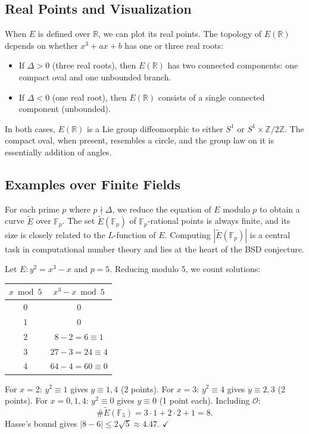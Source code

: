 \subsection{Real Points and Visualization}

When $E$ is defined over $\mathbb{R}$, we can plot its real points. The topology of $E(\mathbb{R})$ depends on whether $x^3 + ax + b$ has one or three real roots:
\begin{itemize}
\item If $\Delta > 0$ (three real roots), then $E(\mathbb{R})$ has two connected components: one compact oval and one unbounded branch.
\item If $\Delta < 0$ (one real root), then $E(\mathbb{R})$ consists of a single connected component (unbounded).
\end{itemize}

In both cases, $E(\mathbb{R})$ is a Lie group diffeomorphic to either $S^1$ or $S^1 \times \mathbb{Z}/2\mathbb{Z}$. The compact oval, when present, resembles a circle, and the group law on it is essentially addition of angles.

\subsection{Examples over Finite Fields}

For each prime $p$ where $p \nmid \Delta$, we reduce the equation of $E$ modulo $p$ to obtain a curve $\widetilde{E}$ over $\mathbb{F}_p$. The set $\widetilde{E}(\mathbb{F}_p)$ of $\mathbb{F}_p$-rational points is always finite, and its size is closely related to the $L$-function of $E$. Computing $|\widetilde{E}(\mathbb{F}_p)|$ is a central task in computational number theory and lies at the heart of the BSD conjecture.

\begin{example}
Let $E: y^2 = x^3 - x$ and $p = 5$. Reducing modulo 5, we count solutions:
\begin{center}
\begin{tabular}{c|c}
$x \bmod 5$ & $x^3 - x \bmod 5$ \\ \hline
0 & 0 \\
1 & 0 \\
2 & $8 - 2 = 6 \equiv 1$ \\
3 & $27 - 3 = 24 \equiv 4$ \\
4 & $64 - 4 = 60 \equiv 0$
\end{tabular}
\end{center}
For $x = 2$: $y^2 \equiv 1$ gives $y \equiv 1, 4$ (2 points). For $x = 3$: $y^2 \equiv 4$ gives $y \equiv 2, 3$ (2 points). For $x = 0, 1, 4$: $y^2 \equiv 0$ gives $y \equiv 0$ (1 point each). Including $\mathcal{O}$:
\[
\#\widetilde{E}(\mathbb{F}_5) = 3 \cdot 1 + 2 \cdot 2 + 1 = 8.
\]
Hasse's bound gives $|8 - 6| \le 2\sqrt{5} \approx 4.47$. $\checkmark$
\end{example}

